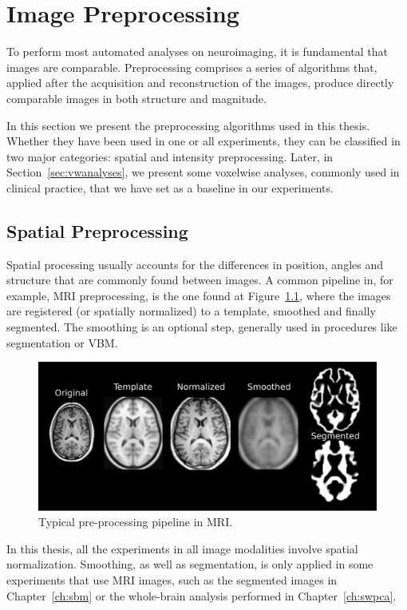 \chapter{Image Preprocessing}\label{ch:mathtest} %
To perform most automated analyses on neuroimaging, it is fundamental that images are comparable. Preprocessing comprises a series of algorithms that, applied after the acquisition and reconstruction of the images, produce directly comparable images in both structure and magnitude. 

In this section we present the preprocessing algorithms used in this thesis. Whether they have been used in one or all experiments, they can be classified in two major categories: spatial and intensity preprocessing. Later, in Section~\ref{sec:vwanalyses}, we present some voxelwise analyses, commonly used in clinical practice, that we have set as a baseline in our experiments. 

\section{Spatial Preprocessing }
Spatial processing usually accounts for the differences in position, angles and structure that are commonly found between images. A common pipeline in, for example, \ac{MRI} preprocessing, is the one found at Figure~\ref{fig:examplePreMRI}, where the images are registered (or spatially normalized) to a template, smoothed and finally segmented. The smoothing is an optional step, generally used in procedures like segmentation or \ac{VBM}. 

\begin{figure}[htp]
	\myfloatalign
	\includegraphics[width=.75\linewidth]{gfx/ch3/preProcessPL}
	\caption[Typical pre-processing pipeline in MRI]{Typical pre-processing pipeline in \ac{MRI}.}\label{fig:examplePreMRI}
\end{figure}

In this thesis, all the experiments in all image modalities involve spatial normalization. Smoothing, as well as segmentation, is only applied in some experiments that use \ac{MRI} images, such as the segmented images in Chapter~\ref{ch:sbm} or the whole-brain analysis performed in Chapter~\ref{ch:swpca}. 

